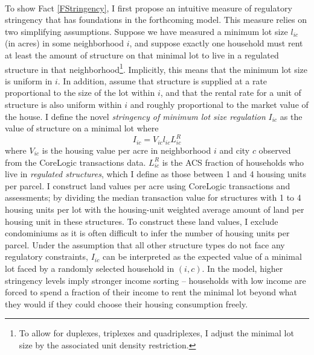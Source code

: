 \documentclass[11pt]{article}
\begin{document}
	\paragraph*{} 
	To show Fact \ref{FStringency}, I first propose an intuitive measure of regulatory stringency that has foundations in the forthcoming model. This measure relies on two simplifying assumptions. Suppose we have measured a minimum lot size $l_{ic}$ (in acres) in some neighborhood $i$, and suppose exactly one household must rent at least the amount of structure on that minimal lot to live in a regulated structure in that neighborhood\footnote{To allow for duplexes, triplexes and quadriplexes, I adjust the minimal lot size by the associated unit density restriction.}. Implicitly, this means that the minimum lot size is uniform in $i$. In addition, assume that structure is supplied at a rate proportional to the size of the lot within $i$, and that the rental rate for a unit of structure is also uniform within $i$ and roughly proportional to the market value of the house. I define the novel \textit{stringency of minimum lot size regulation} $I_{ic}$ as the value of structure on a minimal lot where
	\begin{equation}\label{observedStringency}
		I_{ic} = V_{ic}l_{ic}L^{R}_{ic}
	\end{equation}
	where $V_{ic}$ is the housing value per acre in neighborhood $i$ and city $c$ observed from the CoreLogic transactions data. $L^{R}_{ic}$ is the ACS fraction of households who live in \textit{regulated structures}, which I define as those between 1 and 4 housing units per parcel. I construct land values per acre using CoreLogic transactions and assessments; by dividing the median transaction value for structures with 1 to 4 housing units per lot with the housing-unit weighted average amount of land per housing unit in these structures. To construct these land values, I exclude condominiums as it is often difficult to infer the number of housing units per parcel. Under the assumption that all other structure types do not face any regulatory constraints, $I_{ic}$ can be interpreted as the expected value of a minimal lot faced by a randomly selected household in $(i, c)$. In the model, higher stringency levels imply stronger income sorting -- households with low income are forced to spend a fraction of their income to rent the minimal lot beyond what they would if they could choose their housing consumption freely. 
	
\end{document}
